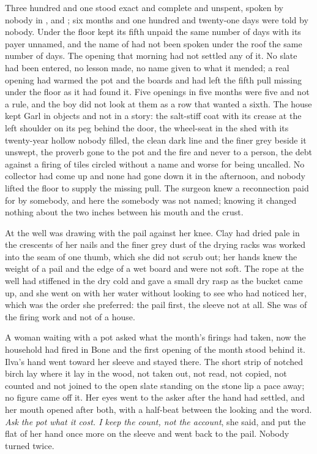 Three hundred and one stood exact and complete and unspent, spoken by nobody in ,  and ; six months and one hundred and twenty-one days were told by nobody. Under the floor  kept its fifth unpaid the same number of days with its payer unnamed, and the name of  had not been spoken under the roof the same number of days. The opening that morning had not settled any of it. No slate had been entered, no lesson made, no name given to what it mended; a real opening had warmed the pot and the boards and had left the fifth pull missing under the floor as it had found it. Five openings in five months were five and not a rule, and the boy did not look at them as a row that wanted a sixth. The house kept Garl in objects and not in a story: the salt-stiff coat with its crease at the left shoulder on its peg behind the door, the wheel-seat in the shed with its twenty-year hollow nobody filled, the clean dark line and the finer grey beside it unswept, the proverb gone to the pot and the fire and never to a person, the debt against a firing of tiles circled without a name and worse for being uncalled. No collector had come up  and none had gone down it in the afternoon, and nobody lifted the floor to supply the missing pull. The surgeon knew a reconnection paid for by somebody, and here the somebody was not named; knowing it changed nothing about the two inches between his mouth and the crust.

\scenebreak

At the well  was drawing with the pail against her knee. Clay had dried pale in the crescents of her nails and the finer grey dust of the drying racks was worked into the seam of one thumb, which she did not scrub out; her hands knew the weight of a pail and the edge of a wet board and were not soft. The rope at the well had stiffened in the dry cold and gave a small dry rasp as the bucket came up, and she went on with her water without looking to see who had noticed her, which was the order she preferred: the pail first, the sleeve not at all. She was of the firing work and not of a house.

A woman waiting with a pot asked what the month's firings had taken, now the household had fired in Bone and the first opening of the month stood behind it. Ilva's hand went toward her sleeve and stayed there. The short strip of notched birch lay where it lay in the wood, not taken out, not read, not copied, not counted and not joined to the open slate standing on the stone lip a pace away; no figure came off it. Her eyes went to the asker after the hand had settled, and her mouth opened after both, with a half-beat between the looking and the word. \emph{Ask the pot what it cost. I keep the count, not the account}, she said, and put the flat of her hand once more on the sleeve and went back to the pail. Nobody turned twice.

